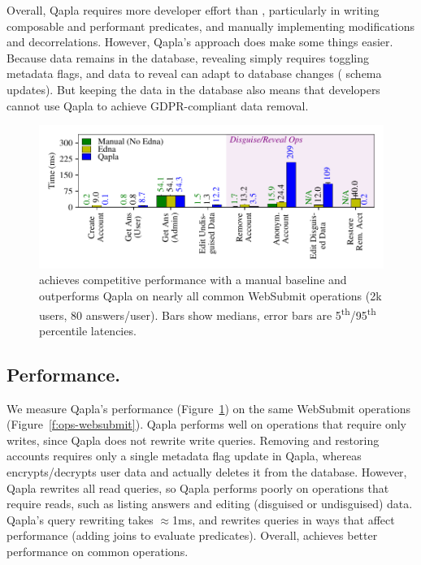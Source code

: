 Overall, Qapla requires more developer effort than \sys, particularly in writing
composable and performant predicates, and manually implementing modifications
and decorrelations. However, Qapla's approach does make some things easier.
%
Because data remains in the database, revealing simply requires toggling
metadata flags, and data to reveal can adapt to database changes (\eg
schema updates). But keeping the data in the database also means that developers cannot use Qapla to
achieve GDPR-compliant data removal. %

%
\begin{figure}[t]
  \centering
      \includegraphics[width=\columnwidth]{figs/websubmit_qapla_op_stats}
    \caption[Latencies of Websubmit operations when implemented with
    Qapla vs. with \sys.]{\sys achieves competitive performance with a manual baseline and
    outperforms Qapla on nearly all common WebSubmit operations (2k users,
    80 answers/user).
    Bars show medians, error bars are 5\textsuperscript{th}/95\textsuperscript{th}
    percentile latencies.}
  \label{f:qapla_ws_opstats}
\end{figure}

%
\subsection{Performance.}
\label{s:eval-qapla-perf}
%
We measure Qapla's performance (Figure~\ref{f:qapla_ws_opstats}) on the same
WebSubmit operations (Figure~\ref{f:ops-websubmit}).
%
Qapla performs well on operations that require only writes, since Qapla does not
rewrite write queries.  Removing and restoring accounts requires only a single
metadata flag update in Qapla, whereas \sys encrypts/decrypts user data and
actually deletes it from the database.
%
However, Qapla rewrites all read queries, so Qapla performs poorly on operations
that require reads, such as listing answers and editing (disguised or
undisguised) data.
%
Qapla's query rewriting takes $\approx$1ms, and rewrites  queries in
ways that affect performance (\eg adding joins to evaluate predicates).
%
Overall, \sys achieves better performance on common operations.

%
